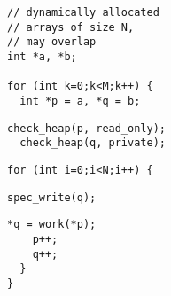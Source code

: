 \begin{lstlisting}[morekeywords={g_qCount},belowskip=0pt, name=ver2b]
// dynamically allocated 
// arrays of size N,
// may overlap
int *a, *b;

for (int k=0;k<M;k++) {
  int *p = a, *q = b;
\end{lstlisting}

\begin{lstlisting}[aboveskip=0pt,belowskip=0pt,backgroundcolor=\color{lightgray},
firstnumber=auto, name=ver2b]
  check_heap(p, read_only);
  check_heap(q, private);
\end{lstlisting}

\begin{lstlisting}[aboveskip=0pt,belowskip=0pt, firstnumber=auto, name=ver2b]
  for (int i=0;i<N;i++) {
\end{lstlisting}

\begin{lstlisting}[aboveskip=0pt,belowskip=0pt,backgroundcolor=\color{lightgray},
firstnumber=auto, name=ver2b]
    spec_write(q);
\end{lstlisting}

\begin{lstlisting}[aboveskip=0pt,belowskip=0pt, firstnumber=auto, name=ver2b]
    *q = work(*p);
    p++;
    q++;
  }
}
\end{lstlisting}
